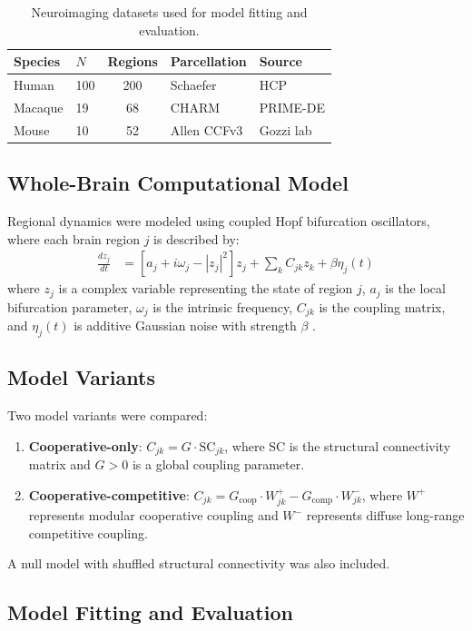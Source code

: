 \documentclass[11pt]{article}
\begin{document}
\begin{table}[ht]
\centering
\caption{Neuroimaging datasets used for model fitting and evaluation.}
\label{tab:data}
\begin{tabular}{@{}llcll@{}}
\toprule
Species & $N$ & Regions & Parcellation & Source \\
\midrule
Human & 100 & 200 & Schaefer & HCP \\
Macaque & 19 & 68 & CHARM & PRIME-DE \\
Mouse & 10 & 52 & Allen CCFv3 & Gozzi lab \\
\bottomrule
\end{tabular}
\end{table}

\subsection{Whole-Brain Computational Model}

Regional dynamics were modeled using coupled Hopf bifurcation oscillators, where each brain region $j$ is described by:
\begin{align}
\frac{dz_j}{dt} &= \left[a_j + i\omega_j - |z_j|^2\right] z_j + \sum_k C_{jk} z_k + \beta \eta_j(t)
\end{align}
where $z_j$ is a complex variable representing the state of region $j$, $a_j$ is the local bifurcation parameter, $\omega_j$ is the intrinsic frequency, $C_{jk}$ is the coupling matrix, and $\eta_j(t)$ is additive Gaussian noise with strength $\beta$ \citep{deco2017single}.

\subsection{Model Variants}

Two model variants were compared:
\begin{enumerate}
    \item \textbf{Cooperative-only}: $C_{jk} = G \cdot \text{SC}_{jk}$, where SC is the structural connectivity matrix and $G > 0$ is a global coupling parameter.
    \item \textbf{Cooperative-competitive}: $C_{jk} = G_{\text{coop}} \cdot W^+_{jk} - G_{\text{comp}} \cdot W^-_{jk}$, where $W^+$ represents modular cooperative coupling and $W^-$ represents diffuse long-range competitive coupling.
\end{enumerate}
A null model with shuffled structural connectivity was also included.

\subsection{Model Fitting and Evaluation}
\end{document}
